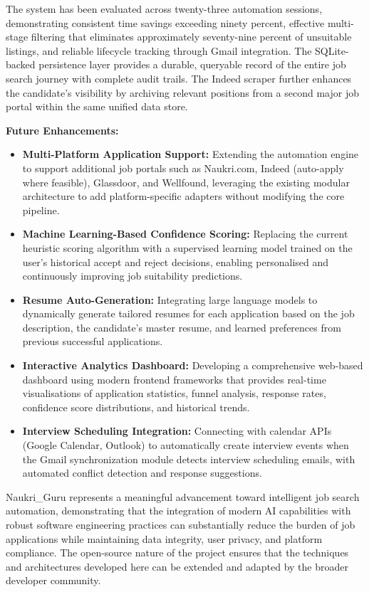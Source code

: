 \documentclass[12pt, a4paper, oneside]{report}
\begin{document}
The system has been evaluated across twenty-three automation sessions, demonstrating consistent time savings exceeding ninety percent, effective multi-stage filtering that eliminates approximately seventy-nine percent of unsuitable listings, and reliable lifecycle tracking through Gmail integration. The SQLite-backed persistence layer provides a durable, queryable record of the entire job search journey with complete audit trails. The Indeed scraper further enhances the candidate's visibility by archiving relevant positions from a second major job portal within the same unified data store.

\noindent\textbf{Future Enhancements:}

\begin{itemize}
    \item \textbf{Multi-Platform Application Support:} Extending the automation engine to support additional job portals such as Naukri.com, Indeed (auto-apply where feasible), Glassdoor, and Wellfound, leveraging the existing modular architecture to add platform-specific adapters without modifying the core pipeline.
    \item \textbf{Machine Learning-Based Confidence Scoring:} Replacing the current heuristic scoring algorithm with a supervised learning model trained on the user's historical accept and reject decisions, enabling personalised and continuously improving job suitability predictions.
    \item \textbf{Resume Auto-Generation:} Integrating large language models to dynamically generate tailored resumes for each application based on the job description, the candidate's master resume, and learned preferences from previous successful applications.
    \item \textbf{Interactive Analytics Dashboard:} Developing a comprehensive web-based dashboard using modern frontend frameworks that provides real-time visualisations of application statistics, funnel analysis, response rates, confidence score distributions, and historical trends.
    \item \textbf{Interview Scheduling Integration:} Connecting with calendar APIs (Google Calendar, Outlook) to automatically create interview events when the Gmail synchronization module detects interview scheduling emails, with automated conflict detection and response suggestions.
\end{itemize}

Naukri\_Guru represents a meaningful advancement toward intelligent job search automation, demonstrating that the integration of modern AI capabilities with robust software engineering practices can substantially reduce the burden of job applications while maintaining data integrity, user privacy, and platform compliance. The open-source nature of the project ensures that the techniques and architectures developed here can be extended and adapted by the broader developer community.
\end{document}
